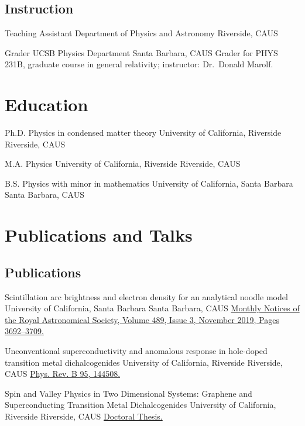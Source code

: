 \documentclass[10pt,letter]{moderncv}
\begin{document}
  \subsection{Instruction}

    {Teaching Assistant}
    {Department of Physics and Astronomy}
    {Riverside, CA}{US}{}

    {Grader}
    {UCSB Physics Department}
    {Santa Barbara, CA}{US}
    {Grader for PHYS 231B, graduate course in general relativity; instructor: Dr.~Donald Marolf.}

  \section{Education}

    {Ph.D. Physics in condensed matter theory}
    {University of California, Riverside}
    {Riverside, CA}{US}{}

    {M.A. Physics}
    {University of California, Riverside}
    {Riverside, CA}{US}{}

    {B.S. Physics with minor in mathematics}
    {University of California, Santa Barbara}
    {Santa Barbara, CA}{US}{}

  \section{Publications and Talks}

  \subsection{Publications}

    {Scintillation arc brightness and electron density for an analytical noodle model}
    {University of California, Santa Barbara}
    {Santa Barbara, CA}{US}
    {\href{https://arxiv.org/abs/1908.00095}
      {Monthly Notices of the Royal Astronomical Society, Volume 489, Issue 3, November 2019, Pages 3692–3709.}}

    {Unconventional superconductivity and anomalous response in hole-doped transition metal dichalcogenides}
    {University of California, Riverside}
    {Riverside, CA}{US}
    {\href{https://journals.aps.org/prb/abstract/10.1103/PhysRevB.95.144508}
      {Phys. Rev. B 95, 144508.}}

    {Spin and Valley Physics in Two Dimensional Systems: Graphene and Superconducting Transition Metal Dichalcogenides}
    {University of California, Riverside}
    {Riverside, CA}{US}
    {\href{https://escholarship.org/uc/item/4941w4t0}
      {Doctoral Thesis.}}
\end{document}
